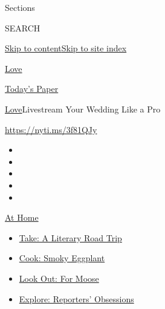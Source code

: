 Sections

SEARCH

\protect\hyperlink{site-content}{Skip to
content}\protect\hyperlink{site-index}{Skip to site index}

\href{https://www.nytimes3xbfgragh.onion/section/fashion/weddings}{Love}

\href{https://myaccount.nytimes3xbfgragh.onion/auth/login?response_type=cookie\&client_id=vi}{}

\href{https://www.nytimes3xbfgragh.onion/section/todayspaper}{Today's
Paper}

\href{/section/fashion/weddings}{Love}\textbar{}Livestream Your Wedding
Like a Pro

\url{https://nyti.ms/3f81QJy}

\begin{itemize}
\item
\item
\item
\item
\item
\end{itemize}

\href{https://www.nytimes3xbfgragh.onion/spotlight/at-home?action=click\&pgtype=Article\&state=default\&region=TOP_BANNER\&context=at_home_menu}{At
Home}

\begin{itemize}
\tightlist
\item
  \href{https://www.nytimes3xbfgragh.onion/2020/07/28/books/time-for-a-literary-road-trip.html?action=click\&pgtype=Article\&state=default\&region=TOP_BANNER\&context=at_home_menu}{Take:
  A Literary Road Trip}
\item
  \href{https://www.nytimes3xbfgragh.onion/2020/07/29/magazine/bored-with-your-home-cooking-some-smoky-eggplant-will-fix-that.html?action=click\&pgtype=Article\&state=default\&region=TOP_BANNER\&context=at_home_menu}{Cook:
  Smoky Eggplant}
\item
  \href{https://www.nytimes3xbfgragh.onion/2020/07/27/travel/moose-michigan-isle-royale.html?action=click\&pgtype=Article\&state=default\&region=TOP_BANNER\&context=at_home_menu}{Look
  Out: For Moose}
\item
  \href{https://www.nytimes3xbfgragh.onion/interactive/2020/at-home/even-more-reporters-editors-diaries-lists-recommendations.html?action=click\&pgtype=Article\&state=default\&region=TOP_BANNER\&context=at_home_menu}{Explore:
  Reporters' Obsessions}
\end{itemize}

